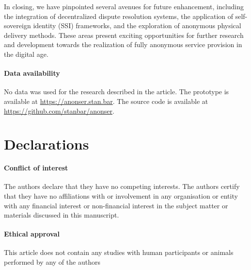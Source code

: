 \documentclass[pdftex,twocolumn,epjc3]{svjour3}
\begin{document}
In closing, we have pinpointed several avenues for future enhancement, including the integration of decentralized dispute resolution systems, the application of self-sovereign identity (SSI) frameworks, and the exploration of anonymous physical delivery methods. These areas present exciting opportunities for further research and development towards the realization of fully anonymous service provision in the digital age.

\paragraph{Data availability}
No data was used for the research described in the article.
The prototype is available at \url{https://anonser.stan.bar}. 
The source code is available at \url{https://github.com/stanbar/anonser}.

\section*{Declarations}

\paragraph{Conflict of interest} The authors declare that they have no competing interests. The authors certify that they have no affiliations with or involvement in any organisation or entity with any financial interest or non-financial interest in the subject matter or materials discussed in this manuscript.

\paragraph{Ethical approval} This article does not contain any studies with human participants or animals performed by any of the authors


\appendix
\end{document}
